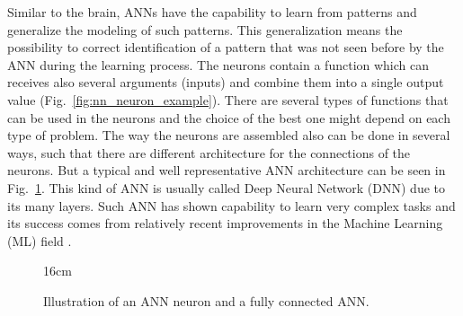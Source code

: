 Similar to the brain, ANNs have the capability to learn from patterns and generalize the modeling of such patterns. This generalization means the possibility to correct identification of a pattern that was not seen before by the ANN during the learning process. The neurons contain a function which can receives also several arguments (inputs) and combine them into a single output value (Fig.~\ref{fig:nn_neuron_example}). There are several types of functions that can be used in the neurons and the choice of the best one might depend on each type of problem. The way the neurons are assembled also can be done in several ways, such that there are different architecture for the connections of the neurons. But a typical and well representative ANN architecture can be seen in Fig.~\ref{fig:neuron_and_dnn}. This kind of ANN is usually called Deep Neural Network (DNN) due to its many layers. Such ANN has shown capability to learn very complex tasks and its success comes from relatively recent improvements in the Machine Learning (ML) field \cite{bib:GlorotAndBendio2010,bib:NairAndHinton2010,bib:Zeiler_et_al2013}.

\begin{figure}[hbtp]{16cm}
	\caption{Illustration of an ANN neuron and a fully connected ANN.}
	\centering
	\quad
	\quad
	\quad
	\label{fig:neuron_and_dnn}
\end{figure}

